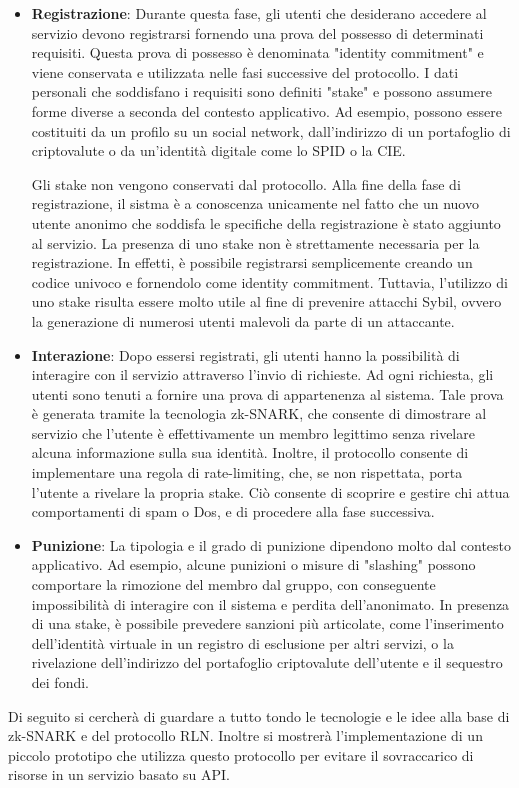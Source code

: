 \begin{itemize}
    \item \textbf{Registrazione}: Durante questa fase, gli utenti che desiderano accedere al servizio devono
    registrarsi fornendo una prova del possesso di determinati requisiti. Questa prova di possesso è denominata
    "identity commitment" e viene conservata e utilizzata nelle fasi successive del protocollo. I dati personali che
    soddisfano i requisiti sono definiti "stake" e possono assumere forme diverse a seconda del contesto applicativo. Ad
    esempio, possono essere costituiti da un profilo su un social network, dall'indirizzo di un portafoglio di
    criptovalute o da un'identità digitale come lo SPID o la CIE.

    Gli stake non vengono conservati dal protocollo. Alla fine della fase di registrazione, il sistma è a conoscenza
    unicamente nel fatto che un nuovo utente anonimo che soddisfa le specifiche della registrazione è
    stato aggiunto al servizio. La presenza di uno stake non è strettamente necessaria per la registrazione.
    In effetti, è possibile registrarsi semplicemente creando un codice univoco e fornendolo come identity commitment.
    Tuttavia, l'utilizzo di uno stake risulta essere molto utile al fine di prevenire attacchi Sybil, ovvero la
    generazione di numerosi utenti malevoli da parte di un attaccante.
    \item \textbf{Interazione}: Dopo essersi registrati, gli utenti hanno la possibilità di interagire con il servizio
    attraverso l'invio di richieste. Ad ogni richiesta, gli utenti sono tenuti a fornire una prova di appartenenza al
    sistema. Tale prova è generata tramite la tecnologia zk-SNARK, che consente di dimostrare al servizio che l'utente è
    effettivamente un membro legittimo senza rivelare alcuna informazione sulla sua identità. Inoltre, il protocollo
    consente di implementare una regola di rate-limiting, che, se non rispettata, porta l'utente a rivelare la propria
    stake. Ciò consente di scoprire e gestire chi attua comportamenti di spam o Dos, e di procedere alla fase
    successiva.
    \item \textbf{Punizione}: La tipologia e il grado di punizione dipendono molto dal contesto applicativo. Ad esempio,
    alcune punizioni o misure di "slashing" possono comportare la rimozione del membro dal gruppo, con conseguente
    impossibilità di interagire con il sistema e perdita dell'anonimato. In presenza di una stake, è possibile
    prevedere sanzioni più articolate, come l'inserimento dell'identità virtuale in un registro di esclusione per altri
    servizi, o la rivelazione dell'indirizzo del portafoglio criptovalute dell'utente e il sequestro dei fondi.
\end{itemize}
Di seguito si cercherà di guardare a tutto tondo le tecnologie e le idee alla base di zk-SNARK e del protocollo RLN.
Inoltre si mostrerà l'implementazione di un piccolo prototipo che utilizza questo protocollo per evitare il sovraccarico
di risorse in un servizio basato su API.
\clearpage